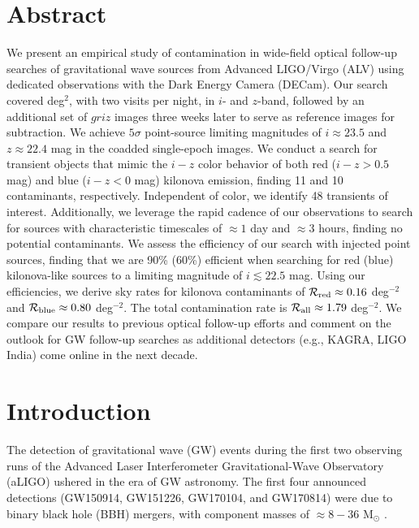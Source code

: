 \clearpage
\section*{Abstract}
We present an empirical study of contamination in wide-field optical follow-up searches of gravitational wave sources from Advanced LIGO/Virgo (ALV) using dedicated observations with the Dark Energy Camera (DECam). Our search covered  deg$^2$, with two visits per night, in $i$- and $z$-band, followed by an additional set of $griz$ images three weeks later to serve as reference images for subtraction. We achieve $5\sigma$ point-source limiting magnitudes of $i \approx 23.5$ and $z \approx 22.4$ mag in the coadded single-epoch images. We conduct a search for transient objects that mimic the $i-z$ color behavior of both red ($i-z > 0.5$ mag) and blue ($i-z < 0$ mag) kilonova emission, finding 11 and 10 contaminants, respectively. Independent of color, we identify 48 transients of interest. Additionally, we leverage the rapid cadence of our observations to search for sources with characteristic timescales of $\approx1$ day and $\approx3$ hours, finding no potential contaminants. We assess the efficiency of our search with injected point sources, finding that we are 90\% (60\%) efficient when searching for red (blue) kilonova-like sources to a limiting magnitude of $i \lesssim 22.5$ mag. Using our efficiencies, we derive sky rates for kilonova contaminants of $\mathcal{R}_{\rm red} \approx 0.16$ deg$^{-2}$ and $\mathcal{R}_{\rm blue} \approx 0.80$ deg$^{-2}$. The total contamination rate is $\mathcal{R}_{\rm all} \approx 1.79$ deg$^{-2}$. We compare our results to previous optical follow-up efforts and comment on the outlook for GW follow-up searches as additional detectors (e.g., KAGRA, LIGO India) come online in the next decade.

\section{Introduction}
\label{sec:ch3_intro}
The detection of gravitational wave (GW) events during the first two observing runs of the Advanced Laser Interferometer Gravitational-Wave Observatory (aLIGO) ushered in the era of GW astronomy. The first four announced detections (GW150914, GW151226, GW170104, and GW170814) were due to binary black hole (BBH) mergers, with component masses of $\approx8-36$ M$_\odot$ \citep{LIGOGW150914,LIGOGW151226,LIGOGW170104,LIGOGW170814}.

